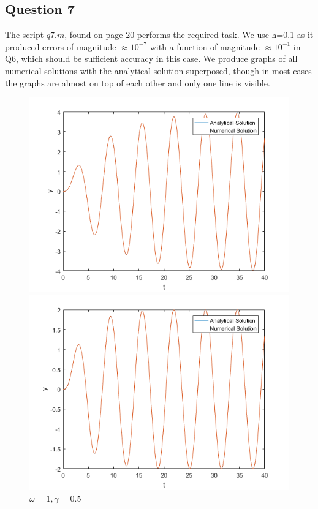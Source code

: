 \documentclass[10pt,a4paper]{report}
\begin{document}
	

\newpage

\subsection*{Question 7}
The script $q7.m$, found on page 20 performs the required task. We use h=0.1 as it produced errors of magnitude $\approx 10^{-7}$ with a function of magnitude $\approx 10^{-1}$ in Q6, which should be sufficient accuracy in this  case. We produce graphs of all numerical solutions with the analytical solution superposed, though in most cases the graphs are almost on top of each other and only one line is visible.

\begin{figure}[H]
\begin{minipage}[b]{0.5\linewidth}
\centering
\includegraphics[width=\textwidth]{q7w1g025.png}
\caption{$\omega=1, \gamma=0.25$}
\label{fig:figure1}
\end{minipage}
\hspace{0.5cm}
\begin{minipage}[b]{0.5\linewidth}
\centering
\includegraphics[width=\textwidth]{q7w1g05.png}
\caption{$\omega=1, \gamma=0.5$}
\label{fig:figure2}
\end{minipage}
\end{figure}
	
\end{document}
